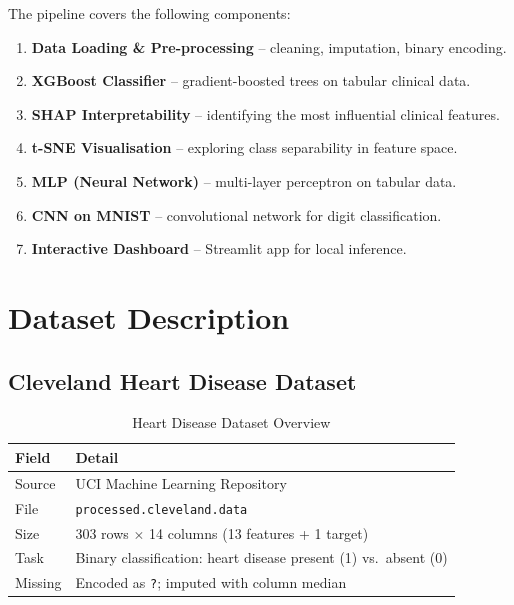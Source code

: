 \documentclass[12pt,a4paper]{article}
\begin{document}
The pipeline covers the following components:
\begin{enumerate}[leftmargin=2cm]
    \item \textbf{Data Loading \& Pre-processing} -- cleaning, imputation, binary encoding.
    \item \textbf{XGBoost Classifier} -- gradient-boosted trees on tabular clinical data.
    \item \textbf{SHAP Interpretability} -- identifying the most influential clinical features.
    \item \textbf{t-SNE Visualisation} -- exploring class separability in feature space.
    \item \textbf{MLP (Neural Network)} -- multi-layer perceptron on tabular data.
    \item \textbf{CNN on MNIST} -- convolutional network for digit classification.
    \item \textbf{Interactive Dashboard} -- Streamlit app for local inference.
\end{enumerate}

\section{Dataset Description}

\subsection{Cleveland Heart Disease Dataset}

\begin{table}[H]
\centering
\caption{Heart Disease Dataset Overview}
\begin{tabular}{ll}
\toprule
\textbf{Field} & \textbf{Detail} \\
\midrule
Source  & UCI Machine Learning Repository \\
File    & \texttt{processed.cleveland.data} \\
Size    & 303 rows $\times$ 14 columns (13 features + 1 target) \\
Task    & Binary classification: heart disease present (1) vs.\ absent (0) \\
Missing & Encoded as \texttt{?}; imputed with column median \\
\bottomrule
\end{tabular}
\end{table}
\end{document}
